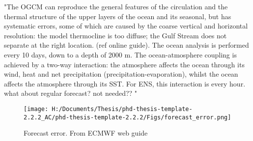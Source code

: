 
"The OGCM can reproduce the general features of the circulation and the thermal structure of the upper layers of the ocean and its seasonal, but has systematic errors, some of which are caused by the coarse vertical and horizontal resolution: the model thermocline is too diffuse; the Gulf Stream does not separate at the right location. (ref online guide).
The ocean analysis is performed every 10 days, down to a depth of 2000 m. The ocean-atmosphere coupling is achieved by a two-way interaction: the atmosphere affects the ocean through its wind, heat and net precipitation (precipitation-evaporation), whilst the ocean affects the atmosphere through its SST. For ENS, this interaction is every hour. what about regular forecast? not needed?? "


\begin{figure}
	
	\texttt{[image: H:/Documents/Thesis/phd-thesis-template-2.2.2\_AC/phd-thesis-template-2.2.2/Figs/forecast\_error.png]}
	\caption{Forecast error. From ECMWF web guide}\label{fig:forecast_error}
	\centering
\end{figure}


